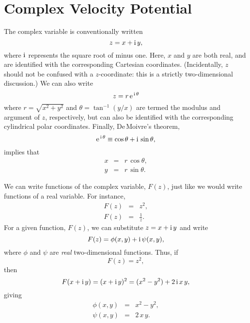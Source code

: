 \section{Complex Velocity Potential}
The complex variable is conventionally written
\begin{equation}
z = x + {\rm i}\,y,
\end{equation}
where ${\rm i}$ represents the square root of minus one. Here, $x$ and $y$ are both real, and are identified with the corresponding
Cartesian coordinates.
(Incidentally, $z$ should not be confused with a $z$-coordinate: this is a strictly two-dimensional discussion.) 
We can also write
\begin{equation}
z = r\,{\rm e}^{\,{\rm i}\,\theta}
\end{equation}
where $r=\sqrt{x^2+y^2}$ and $\theta=\tan^{-1}(y/x)$ are termed the modulus and
argument of $z$, respectively, but can also be identified with the corresponding cylindrical polar coordinates. 
Finally, De\,Moivre's theorem,
\begin{equation}
{\rm e}^{\,{\rm i}\,\theta}\equiv \cos\theta+{\rm i}\,\sin\theta,
\end{equation}
implies that
\begin{eqnarray}
x &=&r\,\cos\theta,\\[0.5ex]
y&=&r\,\sin\theta.
\end{eqnarray}

We can write functions  of the complex variable, $F(z)$, just like
we would write functions of a real variable. For instance,
\begin{eqnarray}
F(z) &=& z^2,\\[0.5ex]
F(z)&=& \frac{1}{z}.
\end{eqnarray}
For a given function, $F(z)$, we can substitute  $z=x +{\rm i}\,y$ and write
\begin{equation}\label{ek5.137}
F(z) = \phi(x, y) + {\rm i}\,\psi(x, y),
\end{equation}
where $\phi$ and $\psi$ are {\em real}\/ two-dimensional functions. Thus, if
\begin{equation}
F(z) = z^2,
\end{equation}
then
\begin{equation}
F(x + {\rm i}\,y) = (x+{\rm i}\,y)^2 = (x^2-y^2) + 2\,{\rm i}\, x\,y,
\end{equation}
giving
\begin{eqnarray}
\phi(x, y) &=& x^2 - y^2,\\[0.5ex]
\psi(x, y) &=& 2\, x\,y.
\end{eqnarray}

